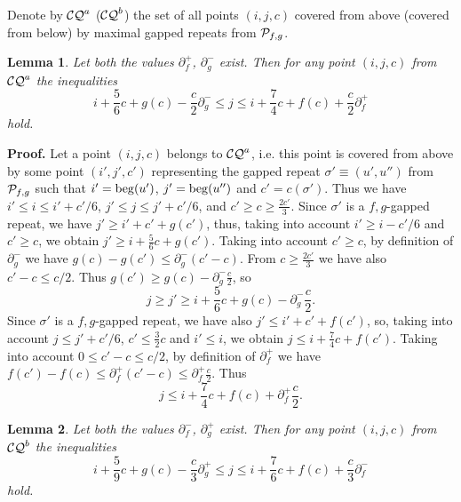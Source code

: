 \documentclass{article}
\newtheorem{lemma}{Lemma}
\begin{document}
Denote by ${\cal CQ}^a$ (${\cal CQ}^b$) the set of all points $(i, j, c)$ covered from 
above (covered from below) by maximal gapped repeats from ${\cal P}_{f, g}$.

\begin{lemma}
Let both the values $\partial^+_f$, $\partial^-_g$ exist. Then for any point $(i, j, c)$ 
from ${\cal CQ}^a$ the inequalities
$$
i+\frac{5}{6}c+g(c)-\frac{c}{2}\partial^-_g\le j\le i+\frac{7}{4}c+f(c)+\frac{c}{2}\partial^+_f
$$
hold.
\label{coverlemma}
\end{lemma}

{\bf Proof.} Let a point $(i, j, c)$ belongs to ${\cal CQ}^a$, i.e. this point
is covered from above by some point $(i', j', c')$ representing the gapped repeat
$\sigma'\equiv (u', u'')$ from ${\cal P}_{f, g}$ such that $i'={\rm beg} (u')$, 
$j'={\rm beg} (u'')$ and $c'=c(\sigma')$. Thus we have $i'\le i \le i'+c'/6$,
$j'\le j \le j'+c'/6$, and $c'\ge c \ge \frac{2c'}{3}$.
Since $\sigma'$ is a $f,g$-gapped repeat, we have $j'\ge i'+c'+g(c')$,
thus, taking into account $i' \ge i-c'/6$ and $c'\ge c$, we obtain 
$j'\ge i+\frac{5}{6}c+g(c')$. Taking into account $c'\ge c$, by definition 
of $\partial^-_g$ we have $g(c)-g(c')\le\partial^-_g (c'-c)$. From $c\ge \frac{2c'}{3}$ 
we have also $c'-c\le c/2$. Thus $g(c')\ge g(c)-\partial^-_g\frac{c}{2}$, so
$$
j\ge j'\ge i+\frac{5}{6}c+g(c)-\partial^-_g\frac{c}{2}.
$$
Since $\sigma'$ is a $f,g$-gapped repeat, we have also $j'\le i'+c'+f(c')$,
so, taking into account $j \le j'+c'/6$, $c'\le\frac{3}{2}c$ and $i'\le i$, 
we obtain $j\le i+\frac{7}{4}c+f(c')$. Taking into account $0\le c'-c\le c/2$,
by definition of $\partial^+_f$ we have $f(c')-f(c)\le\partial^+_f (c'-c)\le
\partial^+_f\frac{c}{2}$. Thus
$$
j\le i+\frac{7}{4}c+f(c)+ \partial^+_f\frac{c}{2}.
$$

\begin{lemma}
Let both the values $\partial^-_f$, $\partial^+_g$ exist. Then for any point $(i, j, c)$ 
from ${\cal CQ}^b$ the inequalities
$$
i+\frac{5}{9}c+g(c)-\frac{c}{3}\partial^+_g\le j\le i+\frac{7}{6}c+f(c)+\frac{c}{3}\partial^-_f
$$
hold.
\label{coverlemmb}
\end{lemma}
\end{document}
